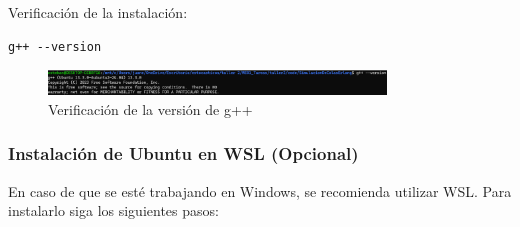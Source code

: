 \documentclass{article}
\begin{document}
Verificación de la instalación:
\begin{verbatim}
g++ --version
\end{verbatim}

\begin{figure}[H]
    \centering
    \includegraphics[width=0.8\textwidth]{images/manualUsuarioErlangBC_2.png}
    \caption{Verificación de la versión de g++}
    \label{fig:version_mm1}
\end{figure}

\subsubsection{Instalación de Ubuntu en WSL (Opcional)}
En caso de que se esté trabajando en Windows, se recomienda utilizar WSL. Para instalarlo siga los siguientes pasos:
\end{document}

